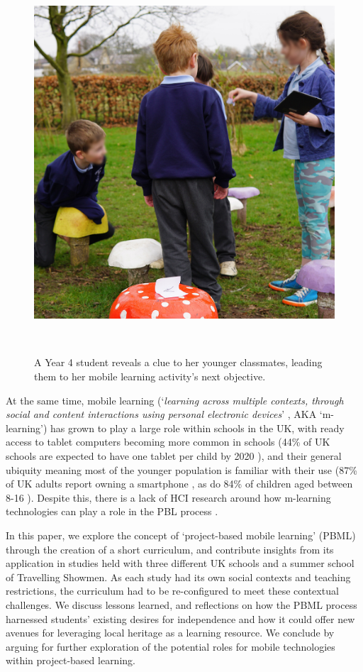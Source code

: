 \documentclass[,hyphens]{sigchi}
\begin{document}
\begin{figure}
\centering
  \includegraphics[width=0.6\columnwidth]{figures/mushrooms}
  \caption{A Year 4 student reveals a clue to her younger classmates, leading them to her mobile learning activity's next objective. }~\label{fig:Mushrooms}
\end{figure}

At the same time, mobile learning (`\textit{learning across multiple contexts, through social and content interactions using personal electronic devices}' \cite{Crompton2013}, AKA `m-learning') has grown to play a large role within schools in the UK, with ready access to tablet computers becoming more common in schools (44\% of UK schools are expected to have one tablet per child by 2020 \cite{BritishEducationalSuppliersAssociation2015}), and their general ubiquity meaning most of the younger population is familiar with their use (87\% of UK adults report owning a smartphone \cite{Statistica2018}, as do 84\% of children aged between 8-16 \cite{Statistica2018a}). Despite this, there is a lack of HCI research around how m-learning technologies can play a role in the PBL process \cite{Chan2015}.

In this paper, we explore the concept of `project-based mobile learning' (PBML) through the creation of a short curriculum, and contribute insights from its application in studies held with three different UK schools and a summer school of Travelling Showmen. As each study had its own social contexts and teaching restrictions, the curriculum had to be re-configured to meet these contextual challenges. We discuss lessons learned, and reflections on how the PBML process harnessed students' existing desires for independence and how it could offer new avenues for leveraging local heritage as a learning resource. We conclude by arguing for further exploration of the potential roles for mobile technologies within project-based learning.
\end{document}
